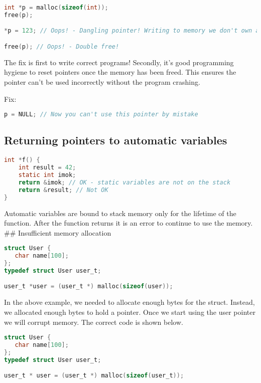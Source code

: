 \begin{lstlisting}[language=C]
int *p = malloc(sizeof(int));
free(p);

*p = 123; // Oops! - Dangling pointer! Writing to memory we don't own anymore

free(p); // Oops! - Double free!
\end{lstlisting}

The fix is first to write correct programs! Secondly, it's good programming hygiene to reset pointers once the memory has been freed. This ensures the pointer can't be used incorrectly without the program crashing.

Fix:

\begin{lstlisting}[language=C]
p = NULL; // Now you can't use this pointer by mistake
\end{lstlisting}

\subsection{Returning pointers to automatic variables}

\begin{lstlisting}[language=C]
int *f() {
    int result = 42;
    static int imok;
    return &imok; // OK - static variables are not on the stack
    return &result; // Not OK
}
\end{lstlisting}

Automatic variables are bound to stack memory only for the lifetime of
the function. After the function returns it is an error to continue to
use the memory. \#\# Insufficient memory allocation

\begin{lstlisting}[language=C]
struct User {
   char name[100];
};
typedef struct User user_t;

user_t *user = (user_t *) malloc(sizeof(user));
\end{lstlisting}

In the above example, we needed to allocate enough bytes for the struct.
Instead, we allocated enough bytes to hold a pointer. Once we start
using the user pointer we will corrupt memory. The correct code is shown
below.

\begin{lstlisting}[language=C]
struct User {
   char name[100];
};
typedef struct User user_t;

user_t * user = (user_t *) malloc(sizeof(user_t));
\end{lstlisting}

